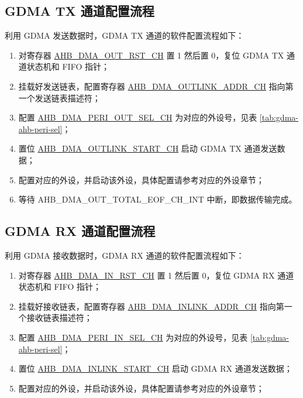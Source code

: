\documentclass[main\_\_CN.tex]{subfiles}
\begin{document}
\subsection{GDMA TX 通道配置流程}
利用 GDMA 发送数据时，GDMA TX 通道的软件配置流程如下：
\begin{enumerate}
    \item 对寄存器 \hyperref[fielddesc:AHBDMAOUTRSTCHN]{AHB\_DMA\_OUT\_RST\_CH} 置 1 然后置 0，复位 GDMA TX 通道状态机和 FIFO 指针；
    \item 挂载好发送链表，配置寄存器 \hyperref[fielddesc:AHBDMAOUTLINKADDRCHN]{AHB\_DMA\_OUTLINK\_ADDR\_CH} 指向第一个发送链表描述符；
    \item 配置 \hyperref[fielddesc:AHBDMAPERIOUTSELCHN]{AHB\_DMA\_PERI\_OUT\_SEL\_CH} 为对应的外设号，见表 \ref{tab:gdma-ahb-peri-sel}；
    \item 置位 \hyperref[fielddesc:AHBDMAOUTLINKSTARTCHN]{AHB\_DMA\_OUTLINK\_START\_CH} 启动 GDMA TX 通道发送数据；
    \item 配置对应的外设，并启动该外设，具体配置请参考对应的外设章节；
    \item 等待 AHB\_DMA\_OUT\_TOTAL\_EOF\_CH\_INT 中断，即数据传输完成。
\end{enumerate}

\subsection{GDMA RX 通道配置流程}
利用 GDMA 接收数据时，GDMA RX 通道的软件配置流程如下：
\begin{enumerate}
    \item 对寄存器 \hyperref[fielddesc:AHBDMAINRSTCHN]{AHB\_DMA\_IN\_RST\_CH} 置 1 然后置 0，复位 GDMA RX 通道状态机和 FIFO 指针；
    \item 挂载好接收链表，配置寄存器 \hyperref[fielddesc:AHBDMAINLINKADDRCHN]{AHB\_DMA\_INLINK\_ADDR\_CH} 指向第一个接收链表描述符；
    \item 配置 \hyperref[fielddesc:AHBDMAPERIINSELCHN]{AHB\_DMA\_PERI\_IN\_SEL\_CH} 为对应的外设号，见表 \ref{tab:gdma-ahb-peri-sel}；
    \item 置位 \hyperref[fielddesc:AHBDMAINLINKSTARTCHN]{AHB\_DMA\_INLINK\_START\_CH} 启动 GDMA RX 通道发送数据；
    \item 配置对应的外设，并启动该外设，具体配置请参考对应的外设章节；
\end{enumerate}
\end{document}
